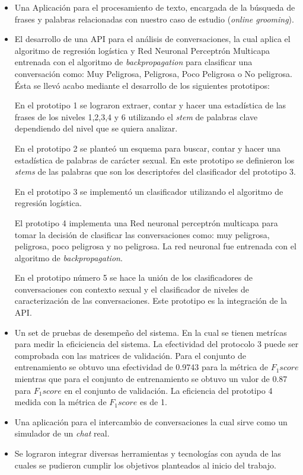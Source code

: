 \begin{itemize}
\item Una Aplicaci\'on para el procesamiento de texto, encargada de la b\'usqueda de frases y palabras relacionadas con nuestro caso de estudio (\textit{online grooming}).
\item El desarrollo de una API para el an\'alisis de conversaciones, la cual aplica el algoritmo de regresi\'on log\'istica y Red Neuronal Perceptr\'on Multicapa entrenada con el algoritmo de \textit{backpropagation} para clasificar una conversaci\'on como: Muy Peligrosa, Peligrosa, Poco Peligrosa o No peligrosa. \'Esta se llev\'o acabo mediante el desarrollo de los siguientes prototipos:

En el prototipo 1 se lograron extraer, contar y hacer una estad\'istica de las frases de los niveles 1,2,3,4 y 6 utilizando el \textit{stem} de palabras clave dependiendo del nivel que se quiera analizar.

En el prototipo 2 se plante\'o un esquema para buscar, contar y hacer una estad\'istica de palabras de car\'acter sexual. En este prototipo se definieron los \textit{stems} de las palabras que son los descripto\'res del clasificador del prototipo 3.

En el prototipo 3 se implement\'o un clasificador utilizando el algoritmo de regresi\'on log\'istica. 

El prototipo 4 implementa una Red neuronal perceptr\'on multicapa para tomar la decisi\'on de clasificar las conversaciones como: muy peligrosa, peligrosa, poco peligrosa y no peligrosa. La red neuronal fue entrenada con el algoritmo de \textit{backpropagation}.

En el  prototipo n\'umero 5 se hace la uni\'on de los clasificadores de conversaciones con contexto sexual y el clasificador de niveles de caracterizaci\'on de las conversaciones. Este prototipo es la integraci\'on de la API.


\item Un set de pruebas de desempe\~no del sistema. En la cual se tienen metr\'icas para medir la eficiciencia del sistema. La efectividad del protocolo 3 puede ser comprobada con las matrices de validaci\'on.  Para el conjunto de entrenamiento se obtuvo una efectividad de 0.9743 para la m\'etrica  de $F_1score$ mientras que para el  conjunto de entrenamiento se obtuvo un valor de 0.87 para $F_1score$ en el conjunto de validaci\'on.
La eficiencia del prototipo 4 medida con la m\'etrica de $F_1score$  es de 1.

\item Una aplicaci\'on para el intercambio de conversaciones la cual sirve como un simulador de un \textit{chat} real. 

\item Se lograron integrar diversas herramientas y tecnolog\'ias con ayuda de las cuales se pudieron cumplir los objetivos planteados al inicio del trabajo.

\end{itemize}












